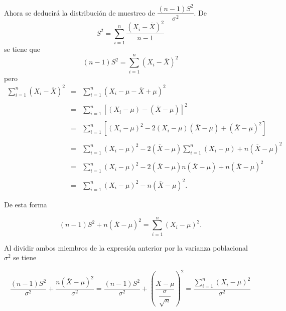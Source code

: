 Ahora se deducirá la distribución de muestreo de $\dfrac{(n-1)S^2}{\sigma^2}$. De  
$$S^2=\sum_{i=1}^n \dfrac{\left(X_i-\overline{X}\right)^2}{n-1}$$
se tiene que
$$(n-1)S^2=\sum_{i=1}^n \left(X_i-\overline{X}\right)^2$$
pero
$$
\begin{array}{rcl}
    \displaystyle\sum_{i=1}^n \left(X_i-\overline{X}\right)^2 &=& \displaystyle\sum_{i=1}^n \left(X_i-\mu-\overline{X}+\mu\right)^2\\\\
							      &=& \displaystyle\sum_{i=1}^n \left[(X_i-\mu)-(\overline{X}-\mu)\right]^2\\\\
							      &=& \displaystyle\sum_{i=1}^n \left[\left(X_i-\mu\right)^2-2\left(X_i-\mu\right)\left(\overline{X}-\mu\right)+\left(\overline{X}-\mu\right)^2\right]\\\\
							      &=& \displaystyle\sum_{i=1}^n \left(X_i-\mu\right)^2-2\left(\overline{X}-\mu\right) \displaystyle\sum_{i=1}^n \left(X_i-\mu\right)+n\left(\overline{X}-\mu\right)^2\\\\
							      &=&\displaystyle\sum_{i=1}^n\left(X_i-\mu\right)^2-2\left(\overline{X}-\mu\right)n\left(\overline{X}-\mu\right)+n\left(\overline{X}-\mu\right)^2\\\\
							      &=& \displaystyle\sum_{i=1}^n \left(X_i-\mu\right)^2-n\left(\overline{X}-\mu\right)^2.
\end{array}
$$

De esta forma

$$(n-1)S^2+n\left(\overline{X}-\mu\right)^2=\sum_{i=1}^n \left(X_i-\mu\right)^2.$$

Al dividir ambos miembros de la expresión anterior por la varianza poblacional $\sigma^2$ se tiene

\begin{tcolorbox}
    $$\dfrac{(n-1)S^2}{\sigma^2}+\dfrac{n\left(\overline{X}-\mu\right)^2}{\sigma^2}=\dfrac{(n-1)S^2}{\sigma^2}+\left(\dfrac{\overline{X}-\mu}{\dfrac{\sigma}{\sqrt{n}}}\right)^2=\dfrac{\displaystyle\sum_{i=1}^n \left(X_i-\mu\right)^2}{\sigma^2}$$
\end{tcolorbox}

